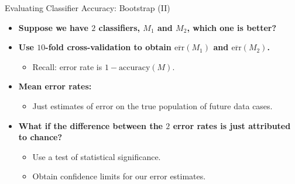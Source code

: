 \begin{frame}{Evaluating Classifier Accuracy: Bootstrap (II)}
  \begin{itemize}
  \item \textbf{Suppose we have $2$ classifiers, $M_1$ and $M_2$, which one is better?}
  \item \textbf{Use $10$-fold cross-validation to obtain $\overline{\text{err}}(M_1)$ and $\overline{\text{err}}(M_2)$.}
    \begin{itemize}
    \item Recall: error rate is $1-\text{accuracy}(M)$.
    \end{itemize}
  \item \textbf{Mean error rates:}
    \begin{itemize}
    \item Just estimates of error on the true population of future data cases.
    \end{itemize}
  \item \textbf{What if the difference between the $2$ error rates is just attributed to chance?}
    \begin{itemize}
    \item Use a test of statistical significance.
    \item Obtain confidence limits for our error estimates.
    \end{itemize}
  \end{itemize}
\end{frame}

